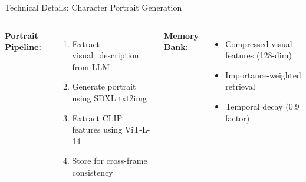 \documentclass{beamer}
\begin{document}
\begin{frame}{Technical Details: Character Portrait Generation}
    \begin{columns}
        \footnotesize
        \textbf{Portrait Pipeline:}
        \begin{enumerate}
            \item Extract visual\_description from LLM
            \item Generate portrait using SDXL txt2img
            \item Extract CLIP features using ViT-L-14
            \item Store for cross-frame consistency
        \end{enumerate}
        \footnotesize
        \textbf{Memory Bank:}
        \begin{itemize}
            \item Compressed visual features (128-dim)
            \item Importance-weighted retrieval
            \item Temporal decay (0.9 factor)
        \end{itemize}
    \end{columns}
\end{frame}
\end{document}
